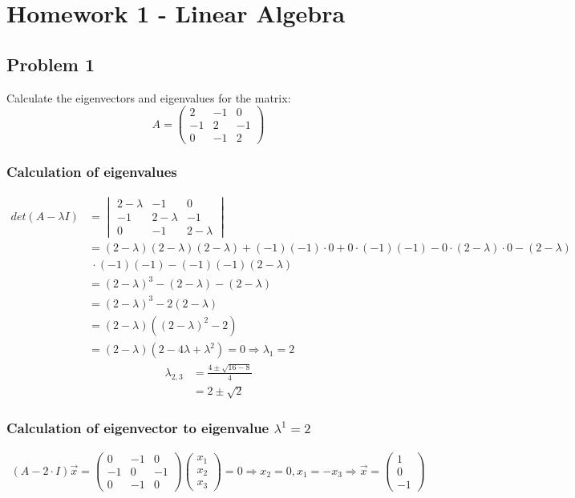 \section*{Homework 1 - Linear Algebra}
\subsection*{Problem 1}
Calculate the eigenvectors and eigenvalues for the matrix:
\begin{equation*}
A=\begin{pmatrix}
2	&	-1	&	0	\\
-1	&	2	&	-1	\\
0	&	-1	&	2
\end{pmatrix}
\end{equation*}

\subsubsection*{Calculation of eigenvalues}
\begin{align*}
det(A-\lambda I) 	&= \begin{vmatrix}
2-\lambda	&	-1	&	0	\\
-1	&	2-\lambda	&	-1	\\
0	&	-1	&	2-\lambda
\end{vmatrix}\\
					&=(2-\lambda)(2-\lambda)(2-\lambda)+(-1)(-1)\cdot 0+0\cdot(-1)(-1)-0\cdot(2-\lambda)\cdot 0 -(2-\lambda)\\
					&\ \cdot(-1)(-1)-(-1)(-1)(2-\lambda)\\
					&=(2-\lambda)^{3}-(2-\lambda)-(2-\lambda)\\
					&=(2-\lambda)^{3}-2(2-\lambda)\\
					&=(2-\lambda)((2-\lambda)^{2}-2)\\
					&=(2-\lambda)(2-4\lambda+\lambda^{2})= 0\Longrightarrow\lambda_{1}=2
\end{align*}
\begin{align*}				
\lambda_{2,3}	&= \frac{4\pm\sqrt{16-8}}{4}\\
				&= 2\pm\sqrt{2}					
\end{align*}

\subsubsection*{Calculation of eigenvector to eigenvalue $\lambda^{1}=2$}
\begin{align*}
(A-2\cdot I)\overrightarrow{x}=\begin{pmatrix}
0	&	-1	&	0\\
-1	&	0	&	-1\\
0	&	-1	&	0
\end{pmatrix} \begin{pmatrix}
x_{1}\\
x_{2}\\
x_{3}
\end{pmatrix} = 0\Rightarrow x_{2}=0,x_{1}=-x_{3}\Rightarrow\overrightarrow{x}=\begin{pmatrix}
1\\
0\\
-1
\end{pmatrix}
\end{align*}

